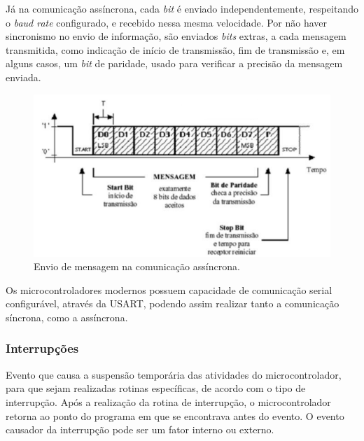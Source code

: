 Já na comunicação assíncrona, cada \textit{bit} é enviado independentemente, respeitando o \textit{baud rate} configurado, e recebido nessa mesma velocidade. Por não haver sincronismo no envio de informação, são enviados \textit{bits} extras, a cada mensagem transmitida, como indicação de início de transmissão, fim de transmissão e, em alguns casos, um \textit{bit} de paridade, usado para verificar a precisão da mensagem enviada.

\begin{figure}[ht]
    \begin{center}
    \includegraphics{figuras/assincrono.PNG}
    \end{center}
    \caption[Comunicação assíncrona]{Envio de mensagem na comunicação assíncrona.}
    \label{assincrono}
\end{figure}

Os microcontroladores modernos possuem capacidade de comunicação serial configurável, através da \ac{USART}, podendo assim realizar tanto a comunicação síncrona, como a assíncrona.

\subsubsection{Interrupções}

Evento que causa a suspensão temporária das atividades do microcontrolador, para que sejam realizadas rotinas específicas, de acordo com o tipo de interrupção. Após a realização da rotina de interrupção, o microcontrolador retorna ao ponto do programa em que se encontrava antes do evento. O evento causador da interrupção pode ser um fator interno ou externo. %

